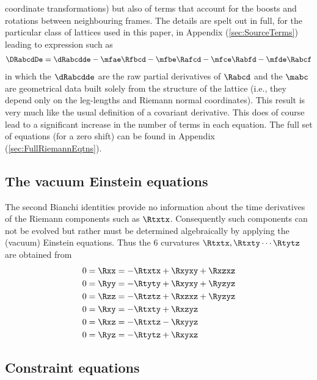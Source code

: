 \documentclass[a4paper,12pt]{article}
\numberwithin{equation}{section}
\begin{document}
coordinate transformations) but also of terms that account for the boosts and rotations
between neighbouring frames. The details are spelt out in full, for the particular class of
lattices used in this paper, in Appendix (\ref{sec:SourceTerms}) leading to expression such
as
\begin{align}
   \label{eqn:CartanRabcd}
   \DRabcdDe = \dRabcdde - \mfae \Rfbcd - \mfbe \Rafcd - \mfce \Rabfd - \mfde \Rabcf
\end{align}
in which the $\dRabcdde$ are the raw partial derivatives of $\Rabcd$ and the $\mabc$
are geometrical data built solely from the structure of the lattice (i.e., they depend
only on the leg-lengths and Riemann normal coordinates). This result is very much like
the usual definition of a covariant derivative. This does of course lead to a
significant increase in the number of terms in each equation. The full set of equations
(for a zero shift) can be found in Appendix (\ref{sec:FullRiemannEqtns}).

\subsection{The vacuum Einstein equations}
\label{sec:VacuumEqtns}

The second Bianchi identities provide no information about the time derivatives of the
Riemann components such as $\Rtxtx$. Consequently such components can not be evolved but
rather must be determined algebraically by applying the (vacuum) Einstein equations. Thus
the 6 curvatures $\Rtxtx,\Rtxty\cdots\Rtytz$ are obtained from
\begin{align}
0 &= \Rxx = -\Rtxtx + \Rxyxy + \Rxzxz\label{eqn:RiemEvolO}\\
0 &= \Ryy = -\Rtyty + \Rxyxy + \Ryzyz\label{eqn:RiemEvolP}\\
0 &= \Rzz = -\Rtztz + \Rxzxz + \Ryzyz\label{eqn:RiemEvolQ}\\
0 &= \Rxy = -\Rtxty + \Rxzyz\label{eqn:RiemEvolR}\\
0 &= \Rxz = -\Rtxtz - \Rxyyz\label{eqn:RiemEvolS}\\
0 &= \Ryz = -\Rtytz + \Rxyxz\label{eqn:RiemEvolT}
\end{align}

\subsection{Constraint equations}
\label{sec:Constraints}
\end{document}
